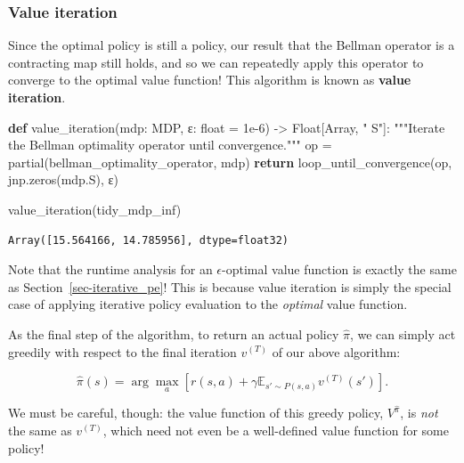\documentclass[
  letterpaper,
  DIV=11,
  numbers=noendperiod]{scrreprt}
\newenvironment{Shaded}{\begin{snugshade}}{\end{snugshade}}
\newcommand{\BuiltInTok}[1]{\textcolor[rgb]{0.00,0.23,0.31}{#1}}
\newcommand{\CommentTok}[1]{\textcolor[rgb]{0.37,0.37,0.37}{#1}}
\newcommand{\ControlFlowTok}[1]{\textcolor[rgb]{0.00,0.23,0.31}{\textbf{#1}}}
\newcommand{\FloatTok}[1]{\textcolor[rgb]{0.68,0.00,0.00}{#1}}
\newcommand{\KeywordTok}[1]{\textcolor[rgb]{0.00,0.23,0.31}{\textbf{#1}}}
\newcommand{\NormalTok}[1]{\textcolor[rgb]{0.00,0.23,0.31}{#1}}
\newcommand{\OperatorTok}[1]{\textcolor[rgb]{0.37,0.37,0.37}{#1}}
\newcommand{\StringTok}[1]{\textcolor[rgb]{0.13,0.47,0.30}{#1}}
\theoremstyle{plain}
\theoremstyle{plain}
\theoremstyle{definition}
\theoremstyle{definition}
\theoremstyle{remark}
\begin{document}
\subsubsection{Value iteration}\label{sec-value_iteration}

Since the optimal policy is still a policy, our result that the Bellman
operator is a contracting map still holds, and so we can repeatedly
apply this operator to converge to the optimal value function! This
algorithm is known as \textbf{value iteration}.

\begin{Shaded}
\begin{Highlighting}[]
\KeywordTok{def}\NormalTok{ value\_iteration(mdp: MDP, ε: }\BuiltInTok{float} \OperatorTok{=} \FloatTok{1e{-}6}\NormalTok{) }\OperatorTok{{-}\textgreater{}}\NormalTok{ Float[Array, }\StringTok{" S"}\NormalTok{]:}
    \CommentTok{"""Iterate the Bellman optimality operator until convergence."""}
\NormalTok{    op }\OperatorTok{=}\NormalTok{ partial(bellman\_optimality\_operator, mdp)}
    \ControlFlowTok{return}\NormalTok{ loop\_until\_convergence(op, jnp.zeros(mdp.S), ε)}
\end{Highlighting}
\end{Shaded}

\begin{Shaded}
\begin{Highlighting}[]
\NormalTok{value\_iteration(tidy\_mdp\_inf)}
\end{Highlighting}
\end{Shaded}

\begin{verbatim}
Array([15.564166, 14.785956], dtype=float32)
\end{verbatim}

Note that the runtime analysis for an \(\epsilon\)-optimal value
function is exactly the same as Section~\ref{sec-iterative_pe}! This is
because value iteration is simply the special case of applying iterative
policy evaluation to the \emph{optimal} value function.

As the final step of the algorithm, to return an actual policy
\(\hat \pi\), we can simply act greedily with respect to the final
iteration \(v^{(T)}\) of our above algorithm:

\[\hat \pi(s) = \arg\max_a \left[ r(s, a) + \gamma \mathbb{E}_{s' \sim P(s, a)} v^{(T)}(s') \right].\]

We must be careful, though: the value function of this greedy policy,
\(V^{\hat \pi}\), is \emph{not} the same as \(v^{(T)}\), which need not
even be a well-defined value function for some policy!
\end{document}
